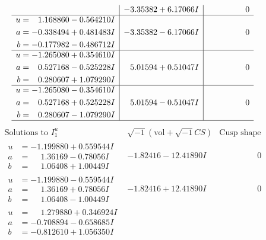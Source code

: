 \documentclass[1p]{elsarticle_modified}
\theoremstyle{definition}
\newcommand{\I}{\sqrt{-1}}
\begin{document}
$$\begin{array}{c|c|c}
 & -3.35382 + 6.17066 I & \phantom{-0.000000 } 0 \\ \hline\begin{aligned}
u &= \phantom{-}1.168860 - 0.564210 I \\
a &= -0.338494 + 0.481483 I \\
b &= -0.177982 - 0.486712 I\end{aligned}
 & -3.35382 - 6.17066 I & \phantom{-0.000000 } 0 \\ \hline\begin{aligned}
u &= -1.265080 + 0.354610 I \\
a &= \phantom{-}0.527168 - 0.525228 I \\
b &= \phantom{-}0.280607 + 1.079290 I\end{aligned}
 & \phantom{-}5.01594 + 0.51047 I & \phantom{-0.000000 } 0 \\ \hline\begin{aligned}
u &= -1.265080 - 0.354610 I \\
a &= \phantom{-}0.527168 + 0.525228 I \\
b &= \phantom{-}0.280607 - 1.079290 I\end{aligned}
 & \phantom{-}5.01594 - 0.51047 I & \phantom{-0.000000 } 0\\
 \hline 
 \end{array}$$\newpage$$\begin{array}{c|c|c}  
\text{Solutions to }I^u_{1}& \I (\text{vol} + \sqrt{-1}CS) & \text{Cusp shape}\\
 \hline 
\begin{aligned}
u &= -1.199880 + 0.559544 I \\
a &= \phantom{-}1.36169 - 0.78056 I \\
b &= \phantom{-}1.06408 + 1.00449 I\end{aligned}
 & -1.82416 - 12.41890 I & \phantom{-0.000000 } 0 \\ \hline\begin{aligned}
u &= -1.199880 - 0.559544 I \\
a &= \phantom{-}1.36169 + 0.78056 I \\
b &= \phantom{-}1.06408 - 1.00449 I\end{aligned}
 & -1.82416 + 12.41890 I & \phantom{-0.000000 } 0 \\ \hline\begin{aligned}
u &= \phantom{-}1.279880 + 0.346924 I \\
a &= -0.708894 - 0.658685 I \\
b &= -0.812610 + 1.056350 I\end{aligned}

\end{array}$$
\end{document}
